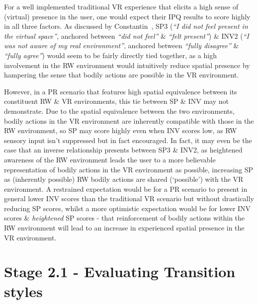For a well implemented traditional VR experience that elicits a high sense of (virtual) presence in the user, one would expect their IPQ results to score highly in all three factors. As discussed by Constantin~\cite{Constantin2003a}, SP3 (\textit{``I did not feel present in the virtual space''}, anchored between \textit{``did not feel''} \& \textit{``felt present''}) \& INV2 (\textit{``I was not aware of my real environment''}, anchored between \textit{``fully disagree''} \& \textit{``fully agree''}) would seem to be fairly directly tied together, as a high involvement in the RW environment would intuitively reduce spatial presence by hampering the sense that bodily actions are possible in the VR environment.

However, in a PR scenario that features high spatial equivalence between its constituent RW \& VR environments, this tie between SP \& INV may not demonstrate. Due to the spatial equivalence between the two environments, bodily actions in the VR environment are inherently compatible with those in the RW environment, so SP may score highly even when INV scores low, as RW sensory input isn't suppressed but in fact encouraged. In fact, it may even be the case that an inverse relationship presents between SP3 \& INV2, as heightened awareness of the RW environment leads the user to a more believable representation of bodily actions in the VR environment as possible, increasing SP as (inherently possible) RW bodily actions are shared (`possible') with the VR environment. A restrained expectation would be for a PR scenario to present in general lower INV scores than the traditional VR scenario but without drastically reducing SP scores, whilst a more optimistic expectation would be for lower INV scores \& \textit{heightened} SP scores - that reinforcement of bodily actions within the RW environment will lead to an increase in experienced spatial presence in the VR environment.





\section{Stage 2.1 - Evaluating Transition styles}

